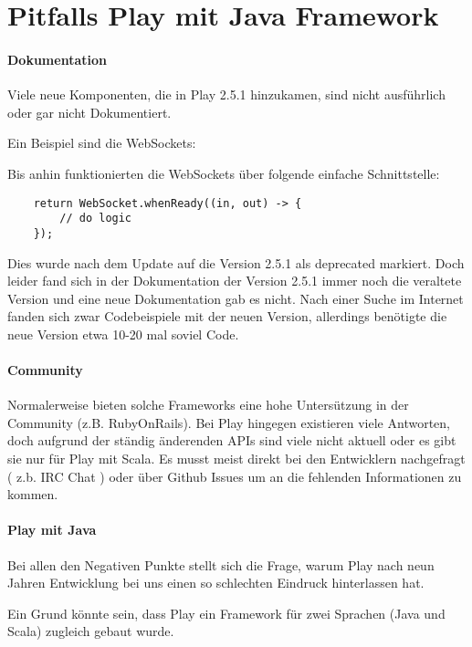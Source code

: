 \chapter{Pitfalls Play mit Java Framework}
\label{ch:play_pitfalls}

\subsubsection{Dokumentation}

Viele neue Komponenten, die in Play 2.5.1 hinzukamen, sind nicht ausführlich oder gar nicht Dokumentiert.

Ein Beispiel sind die WebSockets:

Bis anhin funktionierten die WebSockets über folgende einfache Schnittstelle:
\begin{lstlisting}
    return WebSocket.whenReady((in, out) -> {
        // do logic
    });
\end{lstlisting}

Dies wurde nach dem Update auf die Version 2.5.1 als deprecated markiert. Doch leider fand sich in der Dokumentation der Version 2.5.1 immer noch die veraltete Version und eine neue Dokumentation gab es nicht. Nach einer Suche im Internet fanden sich zwar Codebeispiele mit der neuen Version, allerdings benötigte die neue Version etwa 10-20 mal soviel Code.

\subsubsection{Community}
Normalerweise bieten solche Frameworks eine hohe Untersützung in der Community (z.B. RubyOnRails). Bei Play hingegen existieren viele Antworten, doch aufgrund der ständig änderenden APIs sind viele nicht aktuell oder es gibt sie nur für Play mit Scala. 
Es musst meist direkt bei den Entwicklern nachgefragt ( z.b. IRC Chat ) oder über Github Issues \cite{github-ticket} um an die fehlenden Informationen zu kommen.


\subsubsection{Play mit Java}
Bei allen den Negativen Punkte stellt sich die Frage, warum Play nach neun Jahren Entwicklung bei uns einen so schlechten Eindruck hinterlassen hat. 

Ein Grund könnte sein, dass Play ein Framework für zwei Sprachen (Java und Scala) zugleich gebaut wurde. 